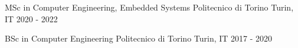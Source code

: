 

\begin{cventries}

  \cventry
    {MSc in Computer Engineering, Embedded Systems} %
    {Politecnico di Torino} %
    {Turin, IT} %
    {2020 - 2022} %
    {
      \begin{cvitems} %
      \end{cvitems}
    }
    
  \cventry
    {BSc in Computer Engineering} %
    {Politecnico di Torino} %
    {Turin, IT} %
    {2017 - 2020} %
    {
      \begin{cvitems} %
      \end{cvitems}
    }
    
\end{cventries}
